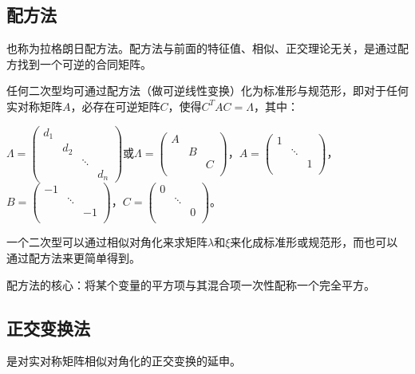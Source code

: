 \subsection{配方法}

也称为拉格朗日配方法。配方法与前面的特征值、相似、正交理论无关，是通过配方找到一个可逆的合同矩阵。

任何二次型均可通过配方法（做可逆线性变换）化为标准形与规范形，即对于任何实对称矩阵$A$，必存在可逆矩阵$C$，使得$C^TAC=\Lambda$，其中：

$\Lambda=\left(\begin{array}{cccc}
    d_1 \\
     & d_2 \\
     & & \ddots \\
     & & & d_n
\end{array}\right)$或$\Lambda=\left(\begin{array}{ccccccccc}
    A \\
     & B \\
     & & C \\
\end{array}\right)$，$A=\left(\begin{array}{ccc}
    1 \\
     & \ddots \\
     & & 1 \\
\end{array}\right)$，$B=\left(\begin{array}{ccc}
    -1 \\
     & \ddots \\
     & & -1 \\
\end{array}\right)$，$C=\left(\begin{array}{ccc}
    0 \\
     & \ddots \\
     & & 0 \\
\end{array}\right)$。\medskip

一个二次型可以通过相似对角化来求矩阵$\lambda$和$\xi$来化成标准形或规范形，而也可以通过配方法来更简单得到。

配方法的核心：将某个变量的平方项与其混合项一次性配称一个完全平方。

\subsection{正交变换法}

是对实对称矩阵相似对角化的正交变换的延申。

